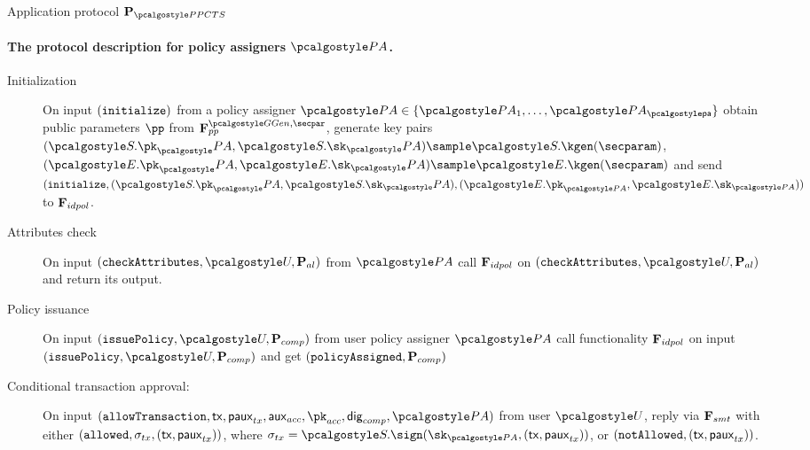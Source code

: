 \documentclass[runningheads,10pt]{llncs}
\numberwithin{equation}{section}
\begin{document}
\begin{protbox}{Application protocol $\prot{\PPCTS}$}
  \paragraph{The protocol description for policy assigners $\polas$.}
  \begin{description}
  \item[Initialization] On input $(\mathtt{initialize})$ from a policy assigner
    $\polas \in \smallset{\polas_1, \ldots, \polas_\noofpolas}$ obtain public
    parameters $\pp$ from $\func{pp}^{\ggen, \secpar}$, generate key pairs
    $(\SIG.\pk_\polas, \SIG.\sk_\polas) \sample \SIG.\kgen(\secparam)$,
    $(\ENC.\pk_\polas, \ENC.\sk_\polas) \sample \ENC.\kgen(\secparam)$ and send
    $(\initialize, (\SIG.\pk_\polas, \SIG.\sk_\polas), (\ENC.\pk_{\polas},
    \ENC.\sk_{\polas}))$ to $\mathbf{F}_{{idpol}}$.
  \item[Attributes check] On input $(\checkAttributes, \user, \alpolicy)$ from
    $\polas$ call $\mathbf{F}_{{idpol}}$ on $(\checkAttributes, \user, \alpolicy)$ and return
    its output.
  \item[Policy issuance] On input $(\issuePolicy, \user, \comppolicy)$ from
    user policy assigner $\polas$ call functionality $\mathbf{F}_{{idpol}}$ on input
    $(\issuePolicy, \user, \comppolicy)$ and get $(\mathtt{policyAssigned},
    \mathbf{P}_{comp})$
  \item[Conditional transaction approval:] On input $(\allowTransaction, \tx,
    \paux_{tx}, \auxacc, \pk_{acc}, \policydig, \polas)$ from user $\user$,
    reply via $\mathbf{F}_{{smt}}$ with either $(\mathtt{allowed}, \sigma_{tx}, (\mathsf{tx},
    \mathsf{paux}_{tx}))$, where $\signature_{tx} = \SIG.\sign(\sk_{\polas}, (\tx,
    \paux_{tx}))$, or $(\mathtt{notAllowed}, (\mathsf{tx}, \mathsf{paux}_{tx}))$.
  \end{description}
\end{protbox}
\end{document}
